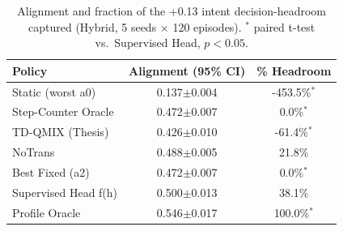 \begin{table}[t]\centering
\caption{Alignment and fraction of the +0.13 intent decision-headroom captured (Hybrid, 5 seeds $\times$ 120 episodes). $^{*}$ paired t-test vs.\ Supervised Head, $p<0.05$.}
\label{tab:headroom}
\begin{tabular}{l c c}
\hline
Policy & Alignment (95\% CI) & \% Headroom \\
\hline
Static (worst a0) & 0.137$\pm$0.004 & -453.5\%$^{*}$ \\
Step-Counter Oracle & 0.472$\pm$0.007 & 0.0\%$^{*}$ \\
TD-QMIX (Thesis) & 0.426$\pm$0.010 & -61.4\%$^{*}$ \\
NoTrans & 0.488$\pm$0.005 & 21.8\% \\
Best Fixed (a2) & 0.472$\pm$0.007 & 0.0\%$^{*}$ \\
Supervised Head f(h) & 0.500$\pm$0.013 & 38.1\% \\
Profile Oracle & 0.546$\pm$0.017 & 100.0\%$^{*}$ \\
\hline
\end{tabular}
\end{table}